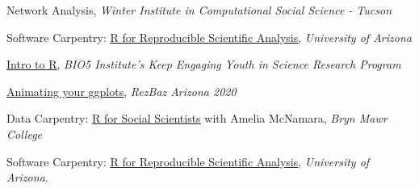 Network Analysis, \emph{Winter Institute in Computational Social Science - Tucson}

Software Carpentry: \underline{\href{https://ua-carpentries-workshops.github.io/2020-11-07-Tucson/}{R for Reproducible Scientific Analysis}}, \emph{University of Arizona}

\underline{\href{https://kelseygonzalez.github.io/portfolio/R_KEYS-Workshop/
}{Intro to R}}, \emph{BIO5 Institute's Keep Engaging Youth in Science Research Program} 

\underline{\href{https://kelseygonzalez.github.io/portfolio/gganimate-lesson/}{Animating your ggplots}}, \emph{RezBaz Arizona 2020}

Data Carpentry: \underline{\href{https://kelseygonzalez.github.io/2020-01-15-brynmawr/}{R for Social Scientists}} with Amelia McNamara, \emph{Bryn Mawr College} 

Software Carpentry: \underline{\href{https://ua-carpentries-workshops.github.io/2019-10-26-Tucson/}{R for Reproducible Scientific Analysis}}, \emph{University of Arizona}. 
